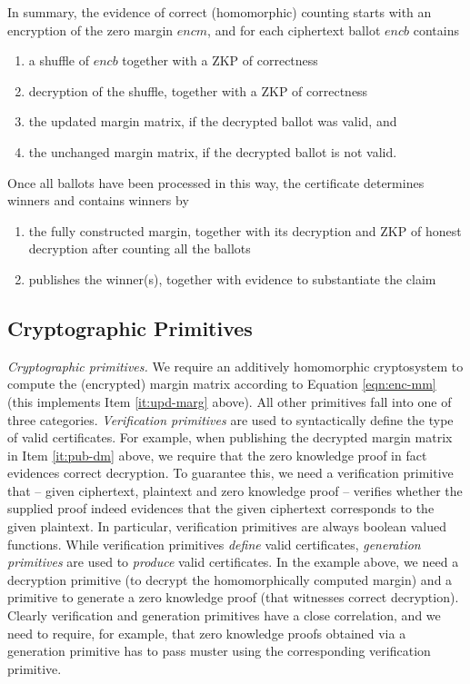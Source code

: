 In summary, the evidence of correct (homomorphic) counting starts
with an encryption of the zero margin $encm$, and for each
ciphertext ballot $encb$ contains
\begin{enumerate}
\item \label{it:shuff} a shuffle of $encb$ together with a ZKP of 
correctness
\item decryption of the  shuffle, together with a ZKP of
correctness
\item \label{it:upd-marg} the updated margin matrix, if the decrypted ballot
was valid, and
\item the unchanged margin matrix, if the decrypted
ballot is not valid.
\end{enumerate}
Once all ballots have been processed in this way, the certificate
determines winners and contains
winners by
\begin{enumerate}
\item \label{it:pub-dm} the fully constructed margin, together with its decryption  
  and ZKP of honest decryption after counting all the ballots     
\item publishes the winner(s), together with evidence to substantiate the
    claim
\end{enumerate}

  \subsection{Cryptographic Primitives}
  
  \smallskip\noindent\emph{Cryptographic primitives.}
We require an additively homomorphic cryptosystem to
compute the (encrypted) margin matrix according to Equation
\ref{eqn:enc-mm} (this implements Item \ref{it:upd-marg} above). All
other primitives fall into one of three categories.
\emph{Verification primitives} are used to syntactically define
the type of valid certificates. For example, when publishing the
decrypted margin matrix in Item \ref{it:pub-dm} above, we require
that the zero knowledge proof in fact evidences correct decryption.
To
guarantee this, we need a verification primitive that -- given
ciphertext, plaintext and zero knowledge proof -- verifies whether the supplied proof
indeed evidences that the given ciphertext corresponds to the given
plaintext. In particular, verification primitives are always boolean
valued functions. While verification primitives \emph{define} valid
certificates, \emph{generation primitives} are used to
\emph{produce} valid certificates. In the example above, we need a
decryption primitive (to decrypt the homomorphically computed
margin) and a primitive to generate a zero knowledge proof (that
witnesses correct decryption). Clearly verification and generation
primitives have a close correlation, and we need to require, for
example, that zero knowledge proofs obtained via a generation
primitive has to pass muster using the corresponding verification
primitive. 

